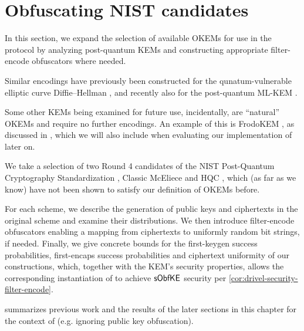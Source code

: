\chapter{Obfuscating NIST candidates}\label{ch:obfuscation}

In this section, we expand the selection of available OKEMs for use in the \drivel{} protocol by analyzing post-quantum KEMs and constructing appropriate filter-encode obfuscators where needed.

Similar encodings have previously been constructed for the qunatum-vulnerable elliptic curve Diffie–Hellman \cite{EC:vAhHop04,tor-dev-udh,USENIX:WWGH11,CCS:BHKL13,FC:Tibouchi14}, and recently also for the post-quantum ML-KEM \cite{fips203,CCS:GunSteVei24}.

Some other KEMs being examined for future use, incidentally, are ``natural'' OKEMs and require no further encodings. An example of this is FrodoKEM \cite{NISTPQC-R3:FrodoKEM20}, as discussed in \cite[Section~2.1]{EPRINT:GRSV25}, which we will also include when evaluating our implementation of \drivel{} later on.

We take a selection of two Round 4 candidates of the NIST Post-Quantum Cryptography Standardization \cite{nist-standardization}, Classic McEliece \cite{NISTPQC-R4:ClassicMcEliece22} and HQC \cite{NISTPQC-R4:HQC22}, which (as far as we know) have not been shown to satisfy our definition of OKEMs before.

For each scheme, we describe the generation of public keys and ciphertexts in the original scheme and examine their distributions. We then introduce filter-encode obfuscators enabling a mapping from ciphertexts to uniformly random bit strings, if needed.
Finally, we give concrete bounds for the first-keygen success probabilities, first-encaps success probabilities and ciphertext uniformity of our constructions, which, together with the KEM's security properties, allows the corresponding instantiation of \drivel{} to achieve $\mathsf{sObfKE}$ security per \cref{cor:drivel-security-filter-encode}.

 summarizes previous work and the results of the later sections in this chapter for the context of \drivel{} (e.g. ignoring public key obfuscation).

